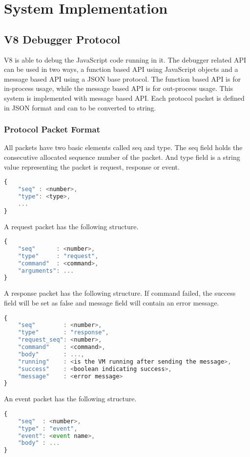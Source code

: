 \chapter {System Implementation}

\section {V8 Debugger Protocol}
V8 is able to debug the JavaScript code running in it. The debugger related API can be used in two ways, a function based API using JavaScript objects and a message based API using a JSON base protocol. The function based API is for in-process usage, while the message based API is for out-process usage. This system is implemented with message based API. Each protocol packet is defined in JSON format and can to be converted to string.

\subsection {Protocol Packet Format}
All packets have two basic elements called seq and type. The seq field holds the consecutive allocated sequence number of the packet. And type field is a string value representing the packet is request, response or event.

\begin{lstlisting}[language=JavaScript]
{
	"seq" : <number>,
	"type": <type>,
	...
}
\end{lstlisting}

A request packet has the following structure.
\begin{lstlisting}[language=JavaScript]
{
	"seq"      : <number>,
	"type"     : "request",
	"command"  : <command>,
	"arguments": ...
}
\end{lstlisting}

A response packet has the following structure. If command failed, the success field will be set as false and message field will contain an error message.
\begin{lstlisting}[language=JavaScript]
{
	"seq"        : <number>,
	"type"       : "response",
	"request_seq": <number>,
	"command"    : <command>,
	"body"       : ...,
	"running"    : <is the VM running after sending the message>,
	"success"    : <boolean indicating success>,
	"message"    : <error message>
}
\end{lstlisting}

An event packet has the following structure.
\begin{lstlisting}[language=JavaScript]
{
	"seq"  : <number>,
	"type" : "event",
	"event": <event name>,
	"body" : ...
}
\end{lstlisting}

